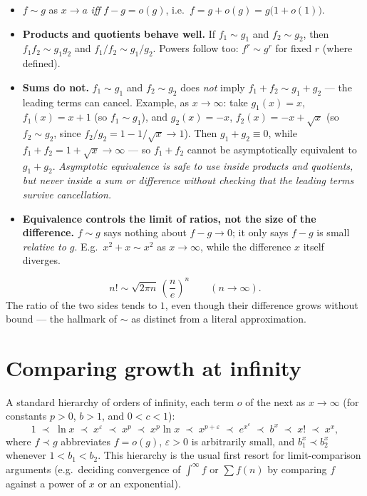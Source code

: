 \documentclass{essay}
\begin{document}
\begin{itemize}
  \item \(f\sim g\) as \(x\to a\) \emph{iff} \(f - g = o(g)\), i.e.\ \(f = g + o(g) = g\big(1+o(1)\big)\).
  \item \textbf{Products and quotients behave well.} If \(f_{1}\sim g_{1}\) and \(f_{2}\sim g_{2}\), then \(f_{1}f_{2} \sim g_{1}g_{2}\) and \(f_{1}/f_{2} \sim g_{1}/g_{2}\). Powers follow too: \(f^{r} \sim g^{r}\) for fixed \(r\) (where defined).
  \item \textbf{Sums do not.} \(f_{1}\sim g_{1}\) and \(f_{2}\sim g_{2}\) does \emph{not} imply \(f_{1}+f_{2} \sim g_{1}+g_{2}\) --- the leading terms can cancel. Example, as \(x\to\infty\): take \(g_{1}(x)=x\), \(f_{1}(x)=x+1\) (so \(f_{1}\sim g_{1}\)), and \(g_{2}(x)=-x\), \(f_{2}(x)=-x+\sqrt{x}\) (so \(f_{2}\sim g_{2}\), since \(f_{2}/g_{2} = 1-1/\sqrt{x}\to 1\)). Then \(g_{1}+g_{2}\equiv 0\), while \(f_{1}+f_{2} = 1+\sqrt{x}\to\infty\) --- so \(f_{1}+f_{2}\) cannot be asymptotically equivalent to \(g_{1}+g_{2}\). \emph{Asymptotic equivalence is safe to use inside products and quotients, but never inside a sum or difference without checking that the leading terms survive cancellation.}
  \item \textbf{Equivalence controls the limit of ratios, not the size of the difference.} \(f\sim g\) says nothing about \(f-g\to 0\); it only says \(f-g\) is small \emph{relative to \(g\)}. E.g.\ \(x^{2}+x \sim x^{2}\) as \(x\to\infty\), while the difference \(x\) itself diverges.
\end{itemize}

\begin{example}
  \[ n! \sim \sqrt{2\pi n}\,\left(\frac{n}{e}\right)^{n} \qquad (n\to\infty). \]
  The ratio of the two sides tends to \(1\), even though their difference grows without bound --- the hallmark of \(\sim\) as distinct from a literal approximation.
\end{example}

\section{Comparing growth at infinity}

A standard hierarchy of orders of infinity, each term \(o\) of the next as \(x\to\infty\) (for constants \(p>0\), \(b>1\), and \(0<c<1\)):
\[ 1 \;\prec\; \ln x \;\prec\; x^{\varepsilon} \;\prec\; x^{p} \;\prec\; x^{p}\ln x \;\prec\; x^{p+\varepsilon} \;\prec\; e^{x^{c}} \;\prec\; b^{x} \;\prec\; x! \;\prec\; x^{x}, \]
where \(f\prec g\) abbreviates \(f=o(g)\), \(\varepsilon>0\) is arbitrarily small, and \(b_{1}^{x} \prec b_{2}^{x}\) whenever \(1<b_{1}<b_{2}\). This hierarchy is the usual first resort for limit-comparison arguments (e.g.\ deciding convergence of \(\int^{\infty} f\) or \(\sum f(n)\) by comparing \(f\) against a power of \(x\) or an exponential).
\end{document}
